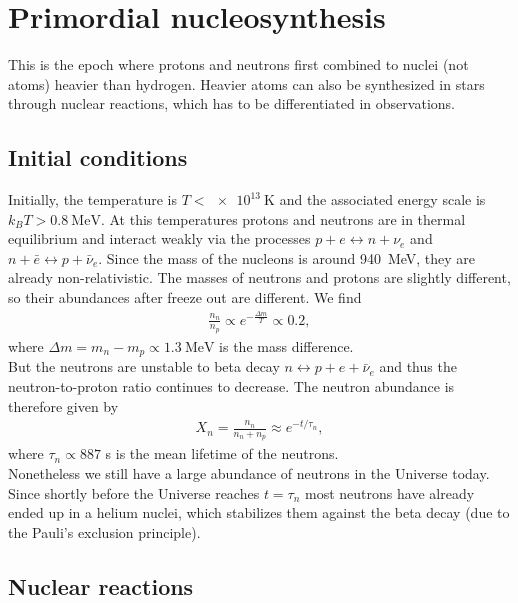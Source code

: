 \section{Primordial nucleosynthesis}

This is the epoch where protons and neutrons first combined to nuclei (not atoms) heavier than hydrogen. Heavier atoms can also be synthesized in stars through nuclear reactions, which has to be differentiated in observations.

\subsection{Initial conditions}

Initially, the temperature is $T < \SI{e13}{\kelvin}$ and the associated energy scale is $k_B T > \SI{0.8}{\MeV}$. At this temperatures protons and neutrons are in thermal equilibrium and interact weakly via the processes $p + e \leftrightarrow n + \nu_e$ and $n + \bar{e} \leftrightarrow p + \bar{\nu}_e$. Since the mass of the nucleons is around \SI{940}{\MeV}, they are already non-relativistic. The masses of neutrons and protons are slightly different, so their abundances after freeze out are different. We find
\begin{align*}
	\frac{n_n}{n_p} \propto e^{-\frac{\Delta m}{T}} \propto 0.2,
\end{align*}
where $\Delta m = m_n - m_p \propto \SI{1.3}{\MeV}$ is the mass difference.\\
But the neutrons are unstable to beta decay $n \leftrightarrow p + e + \bar{\nu}_e$ and thus the neutron-to-proton ratio continues to decrease. The neutron abundance is therefore given by
\begin{align*}
	X_n = \frac{n_n}{n_n + n_p} \approx e^{-t/\tau_n},
\end{align*}
where $\tau_n \propto 887$ s is the mean lifetime of the neutrons.\\
Nonetheless we still have a large abundance of neutrons in the Universe today. Since shortly before the Universe reaches $t = \tau_n$ most neutrons have already ended up in a helium nuclei, which stabilizes them against the beta decay (due to the Pauli's exclusion principle).  

\subsection{Nuclear reactions}

